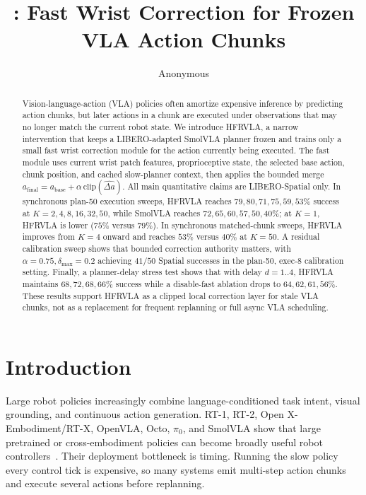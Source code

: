 \documentclass[10pt]{article}
\title{\method: Fast Wrist Correction for Frozen VLA Action Chunks}
\author{Anonymous}
\date{}
\newcommand{\method}{HFRVLA}
\newcommand{\smolvla}{SmolVLA}
\newcommand{\abase}{a_{\mathrm{base}}}
\newcommand{\afinal}{a_{\mathrm{final}}}
\newcommand{\deltah}{\hat{\Delta a}}
\newcommand{\dmax}{\delta_{\max}}
\begin{document}
\maketitle

\begin{abstract}
Vision-language-action (VLA) policies often amortize expensive inference by predicting action chunks, but later actions in a chunk are executed under observations that may no longer match the current robot state. We introduce \method{}, a narrow intervention that keeps a LIBERO-adapted \smolvla{} planner frozen and trains only a small fast wrist correction module for the action currently being executed. The fast module uses current wrist patch features, proprioceptive state, the selected base action, chunk position, and cached slow-planner context, then applies the bounded merge $\afinal=\abase+\alpha\,\mathrm{clip}(\deltah)$. All main quantitative claims are LIBERO-Spatial only. In synchronous plan-50 execution sweeps, \method{} reaches $79,80,71,75,59,53\%$ success at $K=2,4,8,16,32,50$, while \smolvla{} reaches $72,65,60,57,50,40\%$; at $K=1$, \method{} is lower ($75\%$ versus $79\%$). In synchronous matched-chunk sweeps, \method{} improves from $K=4$ onward and reaches $53\%$ versus $40\%$ at $K=50$. A residual calibration sweep shows that bounded correction authority matters, with $\alpha=0.75,\dmax=0.2$ achieving $41/50$ Spatial successes in the plan-50, exec-8 calibration setting. Finally, a planner-delay stress test shows that with delay $d=1..4$, \method{} maintains $68,72,68,66\%$ success while a disable-fast ablation drops to $64,62,61,56\%$. These results support \method{} as a clipped local correction layer for stale VLA chunks, not as a replacement for frequent replanning or full async VLA scheduling.
\end{abstract}

\section{Introduction}

Large robot policies increasingly combine language-conditioned task intent, visual grounding, and continuous action generation. RT-1, RT-2, Open X-Embodiment/RT-X, OpenVLA, Octo, $\pi_0$, and \smolvla{} show that large pretrained or cross-embodiment policies can become broadly useful robot controllers~\citep{brohan2022rt1,brohan2023rt2,openx2024,kim2024openvla,ghosh2024octo,black2024pi0,shukor2025smolvla}. Their deployment bottleneck is timing. Running the slow policy every control tick is expensive, so many systems emit multi-step action chunks and execute several actions before replanning.
\end{document}
